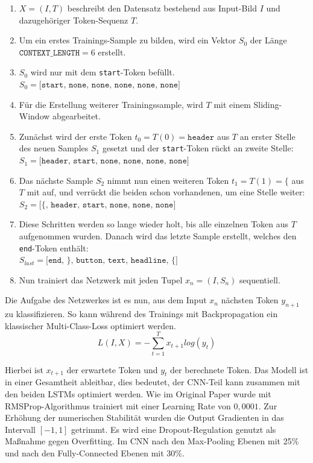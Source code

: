 \documentclass[pdftex,a4paper,halfparskip, article]{scrartcl}
\begin{document}
\begin{enumerate}
	\item $X = (I, T)$ beschreibt den Datensatz bestehend aus Input-Bild $I$ und dazugehöriger Token-Sequenz $T$.
	\item Um ein erstes Trainings-Sample zu bilden, wird ein Vektor $S_0$ der Länge $\texttt{CONTEXT\_LENGTH} = 6$ erstellt.
	\item $S_0$ wird nur mit dem \texttt{start}-Token befüllt. $S_0 = \texttt{[start, none, none, none, none, none]}$
	\item Für die Erstellung weiterer Trainingssample, wird $T$ mit einem Sliding-Window abgearbeitet. 
	\item Zunächst wird der erste Token $t_0 = T(0) = \texttt{header}$ aus $T$ an erster Stelle des neuen Samples $S_1$ gesetzt und der \texttt{start}-Token rückt an zweite Stelle: \\
	$S_1 = \texttt{[header, start, none, none, none, none]}$
	\item Das nächste Sample $S_2$ nimmt nun einen weiteren Token $t_1 = T(1) = \{$ aus $T$ mit auf, und verrückt die beiden schon vorhandenen, um eine Stelle weiter: \\
	$S_2 = \texttt{[\{, header, start, none, none, none]}$
	\item Diese Schritten werden so lange wieder holt, bis alle einzelnen Token aus $T$ aufgenommen wurden. Danach wird das letzte Sample erstellt, welches den \texttt{end}-Token enthält: \\
	$S_{last} = \texttt{[end, \}, button, text, headline, \{]}$
	\item Nun trainiert das Netzwerk mit jeden Tupel $x_n = (I, S_n)$ sequentiell.
\end{enumerate}



Die Aufgabe des Netzwerkes ist es nun, aus dem Input $x_n$ nächsten Token $y_{n+1}$ zu klassifizieren. So kann während des Trainings mit Backpropagation ein klassischer Multi-Class-Loss optimiert werden.
\begin{equation}
L(I, X) =  -\sum_{t=1}^T x_{t+1} log(y_t)
\end{equation}

Hierbei ist $x_{t+1}$ der erwartete Token und $y_t$ der berechnete Token. Das Modell ist in einer Gesamtheit ableitbar, dies bedeutet, der CNN-Teil kann zusammen mit den beiden LSTMs optimiert werden. Wie im Original Paper wurde mit RMSProp-Algorithmus trainiert mit einer Learning Rate von $0,0001$. Zur Erhöhung der numerischen Stabilität wurden die Output Gradienten in das Intervall $[-1,1]$ getrimmt. Es wird eine Dropout-Regulation genutzt als  Maßnahme gegen Overfitting. Im CNN nach den Max-Pooling Ebenen mit 25\% und nach den Fully-Connected Ebenen mit 30\%.
\end{document}
